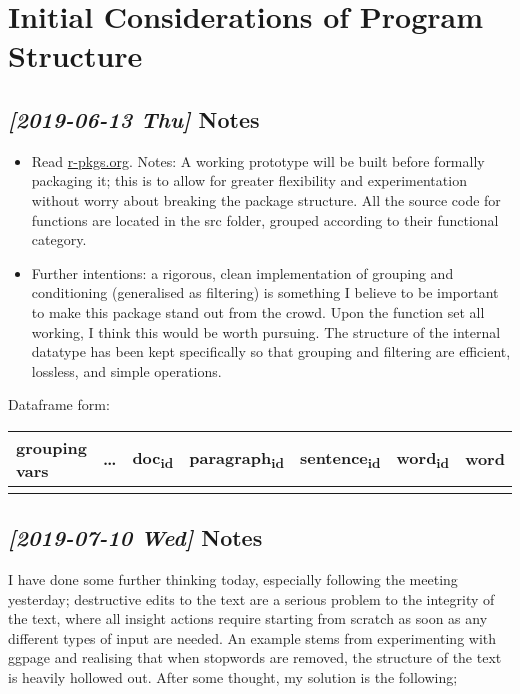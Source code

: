 \documentclass[a4paper, 11pt]{article}
\begin{document}
\section{Initial Considerations of Program Structure}
\label{sec:orged40c13}
\subsection{\textit{[2019-06-13 Thu] } Notes}
\label{sec:org6b22b89}
\begin{itemize}
\item Read \href{http://r-pkgs.org}{r-pkgs.org}. Notes: A working prototype will be built before
formally packaging it; this is to allow for greater flexibility and
experimentation without worry about breaking the package structure.
All the source code for functions are located in the src folder,
grouped according to their functional category.
\item Further intentions: a rigorous, clean implementation of grouping and
conditioning (generalised as filtering) is something I believe to be
important to make this package stand out from the crowd. Upon the
function set all working, I think this would be worth pursuing. The
structure of the internal datatype has been kept specifically so
that grouping and filtering are efficient, lossless, and simple
operations.
\end{itemize}
Dataframe form:

\begin{center}
\begin{tabular}{lllllll}
grouping vars & \ldots{} & doc\textsubscript{id} & paragraph\textsubscript{id} & sentence\textsubscript{id} & word\textsubscript{id} & word\\
\hline
 &  &  &  &  &  & \\
\end{tabular}
\end{center}
\subsection{\textit{[2019-07-10 Wed] } Notes}
\label{sec:org46b4718}
I have done some further thinking today, especially
following the meeting yesterday; destructive edits to the text are a
serious problem to the integrity of the text, where all insight
actions require starting from scratch as soon as any different types
of input are needed. An example stems from experimenting with ggpage and
realising that when stopwords are removed, the structure of the text
is heavily hollowed out. After some thought, my solution is the following;
\end{document}
